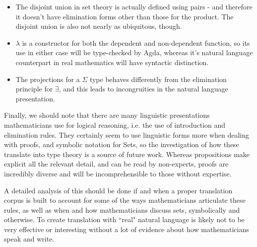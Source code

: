 \begin{itemize}
\item The disjoint union in set theory is actually defined using 
pairs - and therefore it doesn't have elimination forms other than those
for the product. The disjoint union is also not nearly as ubiquitous, though.
\item $\lambda$ is a constructor for both the dependent and
non-dependent function, so its use in either case will be type-checked by Agda,
whereas it's natural language counterpart in real mathematics will have
syntactic distinction.
\item The projections for a $\Sigma$ type behaves differently from the
elimination principle for $\exists$, and this leads to
incongruities in the natural language presentation.
\end{itemize}

Finally, we should note that there are many linguistic presentations
mathematicians use for logical reasoning, i.e. the use of introduction and
elimination rules. They certainly seem to use linguistic forms more when dealing
with proofs, and symbolic notation for Sets, so the investigation of how these
translate into type theory is a source of future work. Whereas propositions make
explicit all the relevant detail, and can be read by non-experts, proofs are
incredibly diverse and will be incomprehensible to those without expertise. 

A detailed analysis of this should be done if and when a proper translation
corpus is built to account for some of the ways mathematicians articulate these
rules, as well as when and how mathematicians discuss sets,
symbolically and otherwise. To create translation with ``real" natural language 
is likely not to be very effective or interesting without a lot of evidence about
how mathematicians speak and write.






